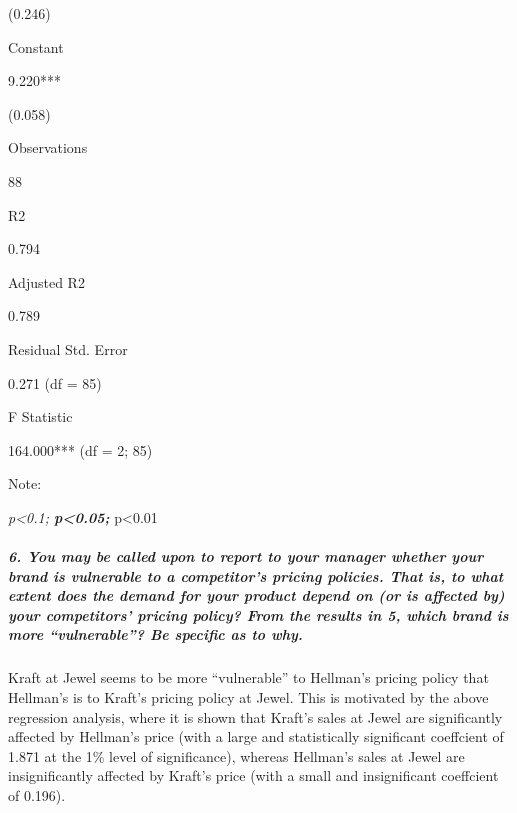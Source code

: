 \documentclass[]{article}
\let\oldsubparagraph\subparagraph
\renewcommand{\subparagraph}[1]{\oldsubparagraph{#1}\mbox{}}
\begin{document}
(0.246)

Constant

9.220***

(0.058)

Observations

88

R2

0.794

Adjusted R2

0.789

Residual Std. Error

0.271 (df = 85)

F Statistic

164.000*** (df = 2; 85)

Note:

\emph{p\textless{}0.1; \textbf{p\textless{}0.05; }}p\textless{}0.01

\hypertarget{you-may-be-called-upon-to-report-to-your-manager-whether-your-brand-is-vulnerable-to-a-competitors-pricing-policies.-that-is-to-what-extent-does-the-demand-for-your-product-depend-on-or-is-affected-by-your-competitors-pricing-policy-from-the-results-in-5-which-brand-is-more-vulnerable-be-specific-as-to-why.}{%
\subparagraph{6. You may be called upon to report to your manager
whether your brand is vulnerable to a competitor's pricing policies.
That is, to what extent does the demand for your product depend on (or
is affected by) your competitors' pricing policy? From the results in 5,
which brand is more ``vulnerable''? Be specific as to
why.}\label{you-may-be-called-upon-to-report-to-your-manager-whether-your-brand-is-vulnerable-to-a-competitors-pricing-policies.-that-is-to-what-extent-does-the-demand-for-your-product-depend-on-or-is-affected-by-your-competitors-pricing-policy-from-the-results-in-5-which-brand-is-more-vulnerable-be-specific-as-to-why.}}

Kraft at Jewel seems to be more ``vulnerable'' to Hellman's pricing
policy that Hellman's is to Kraft's pricing policy at Jewel. This is
motivated by the above regression analysis, where it is shown that
Kraft's sales at Jewel are significantly affected by Hellman's price
(with a large and statistically significant coeffcient of 1.871 at the
1\% level of significance), whereas Hellman's sales at Jewel are
insignificantly affected by Kraft's price (with a small and
insignificant coeffcient of 0.196).
\end{document}

